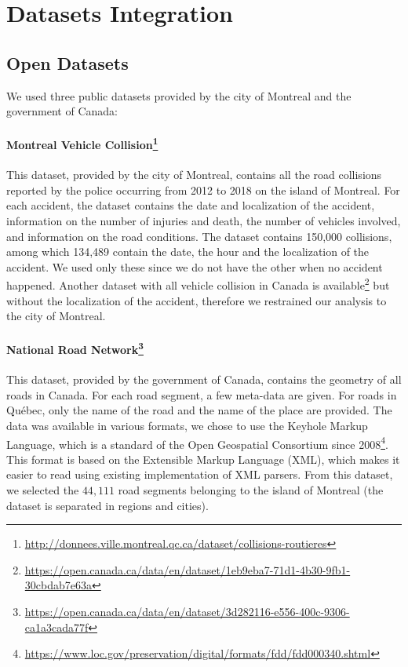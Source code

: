 \documentclass[conference]{IEEEtran}
\newcommand{\english}[1]{\uwave{#1}}  %
\begin{document}
\section{Datasets Integration}


\subsection{Open Datasets}
\label{sec:datasets}

We used three public datasets provided by the city of Montreal and the government of Canada: 

\paragraph{Montreal Vehicle Collision\protect\footnote{\url{http://donnees.ville.montreal.qc.ca/dataset/collisions-routieres}}}

This dataset, provided by the city of Montreal, contains all the road
collisions reported by the police occurring from 2012 to 2018 on the island
of Montreal. For each accident, the dataset contains the date and
localization of the accident, information on the number of injuries and
death, the number of vehicles involved, and information on the road
conditions. The dataset contains 150,000 collisions, among which 134,489
contain the date, the hour and the localization of the accident. We used
only these \english{pieces of information} since we do not have the other \english{pieces
of information} when no accident happened.
Another dataset with all vehicle collision in Canada is available\footnote{\protect\url{https://open.canada.ca/data/en/dataset/1eb9eba7-71d1-4b30-9fb1-30cbdab7e63a}} but
without the localization of the accident, therefore we restrained our
analysis to the city of Montreal.

\paragraph{National Road Network\protect\footnote{\url{https://open.canada.ca/data/en/dataset/3d282116-e556-400c-9306-ca1a3cada77f}}}

This dataset, provided by the government of Canada, contains the geometry of
all roads in Canada. For each road segment, a few meta-data are given. For
roads in Québec, only the name of the road and the name of the place are provided. The
data was available in various formats, we chose to use the Keyhole Markup
Language, which is a standard of the Open Geospatial Consortium since 2008\protect\footnote{\url{https://www.loc.gov/preservation/digital/formats/fdd/fdd000340.shtml}}. 
This format is based on the Extensible Markup Language (XML), which makes it
easier to read using existing implementation of XML parsers. From this
dataset, we selected the $44,111$ road segments belonging to the island of
Montreal (the dataset is separated in regions and cities).
\end{document}
